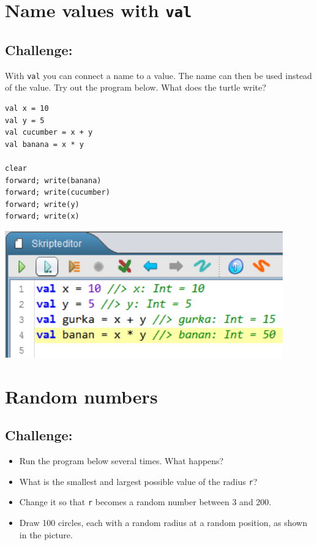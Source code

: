 \chapter{Name values with \lstinline{val}}
\begin{multicols}{2}
\section*{\color{BrickRed}Challenge:}
With \lstinline{val} you can connect a name to a value. The name can then be used instead of the value. Try out the program below. What does the turtle write?

\begin{lstlisting}[numbers=none]
val x = 10
val y = 5
val cucumber = x + y
val banana = x * y

clear
forward; write(banana)
forward; write(cucumber)
forward; write(y)
forward; write(x)
\end{lstlisting}
        

\columnbreak

\begin{center}
\includegraphics[width=12.0cm]{../img/val.png}
\end{center}

\end{multicols}

\chapter{Random numbers}\section*{\color{BrickRed}Challenge:}


\begin{itemize}

\item {Run the program below several times. What happens?}
\item {What is the smallest and largest possible value of the radius \lstinline{r}?}
\item {Change it so that \lstinline{r} becomes a random number between 3 and 200.}
\item {Draw 100 circles, each with a random radius at a random position, as shown in the picture.}

\end{itemize}



